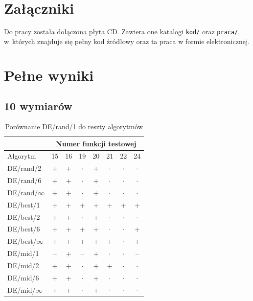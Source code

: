 \documentclass[a4paper,onecolumn,oneside,12pt,wide,floatssmall]{mwrep}
\theoremstyle{definition}
\theoremstyle{plain}%
\theoremstyle{remark}
\begin{document}
\appendix

\chapter{Załączniki}

Do pracy została dołączona płyta CD. Zawiera one katalogi \texttt{kod/} oraz \texttt{praca/},
w~których znajduje się pełny kod źródłowy oraz ta praca w formie elektronicznej.

\chapter{Pełne wyniki}

\section{10 wymiarów}

\begin{table}[H]
\centering
\begin{tabular}{ l | c | c | c | c | c | c | c }
		 & \multicolumn{7}{c}{Numer funkcji testowej}  \\  \hline
Algorytm         &15& 16& 19& 20& 21& 22& 24 \\ \hline
DE/rand/2	 & + & + & $\cdot$ & + & $\cdot$ & $\cdot$ & $\cdot$ \\
DE/rand/6	 & + & + & $\cdot$ & + & $\cdot$ & $\cdot$ & $\cdot$ \\
DE/rand/$\infty$	 & + & + & $\cdot$ & + & $\cdot$ & $\cdot$ & $\cdot$ \\
DE/best/1	 & + & + & + & + & + & + & + \\
DE/best/2	 & + & + & $\cdot$ & + & $\cdot$ & $\cdot$ & $\cdot$ \\
DE/best/6	 & + & + & + & + & $\cdot$ & $\cdot$ & + \\
DE/best/$\infty$	 & + & + & + & + & + & $\cdot$ & + \\
DE/mid/1	 & -- & + & -- & + & $\cdot$ & $\cdot$ & -- \\
DE/mid/2	 & + & + & $\cdot$ & + & + & $\cdot$ & $\cdot$ \\
DE/mid/6	 & + & + & $\cdot$ & + & $\cdot$ & $\cdot$ & $\cdot$ \\
DE/mid/$\infty$	 & + & + & $\cdot$ & + & $\cdot$ & $\cdot$ & $\cdot$ \\
\end{tabular}
\caption{Porównanie DE/rand/1 do reszty algorytmów}
\end{table}
\end{document}
